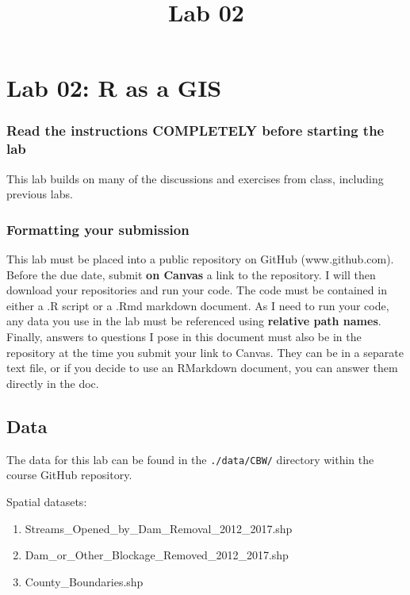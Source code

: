 \documentclass[]{article}
\title{Lab 02}
\author{}
\date{}
\makeatletter
\renewcommand{\maketitle}{\bgroup\vspace*{-1cm}\setlength{\parindent}{0pt}
\begin{flushleft}
  \@author
  
  \@date
  
\end{flushleft}\egroup
}
\makeatother
\begin{document}
\maketitle

\section{Lab 02: R as a GIS}\label{lab-02-r-as-a-gis}

\subsubsection{Read the instructions COMPLETELY before starting the
lab}\label{read-the-instructions-completely-before-starting-the-lab}

This lab builds on many of the discussions and exercises from class,
including previous labs.

\subsubsection{Formatting your
submission}\label{formatting-your-submission}

This lab must be placed into a public repository on GitHub
(www.github.com). Before the due date, submit \textbf{on Canvas} a link
to the repository. I will then download your repositories and run your
code. The code must be contained in either a .R script or a .Rmd
markdown document. As I need to run your code, any data you use in the
lab must be referenced using \textbf{relative path names}. Finally,
answers to questions I pose in this document must also be in the
repository at the time you submit your link to Canvas. They can be in a
separate text file, or if you decide to use an RMarkdown document, you
can answer them directly in the doc.

\subsection{Data}\label{data}

The data for this lab can be found in the \texttt{./data/CBW/} directory
within the course GitHub repository.

Spatial datasets:

\begin{enumerate}
\def\labelenumi{\arabic{enumi}.}
\item
  Streams\_Opened\_by\_Dam\_Removal\_2012\_2017.shp
\item
  Dam\_or\_Other\_Blockage\_Removed\_2012\_2017.shp
\item
  County\_Boundaries.shp
\end{enumerate}
\end{document}
